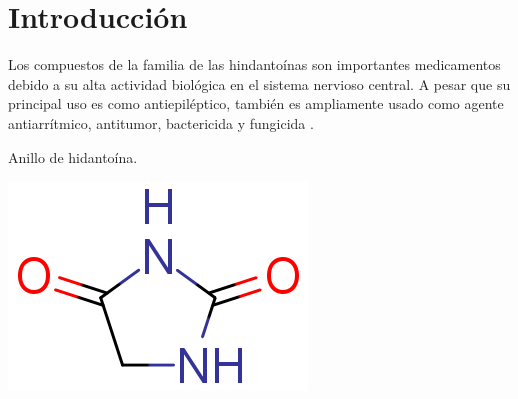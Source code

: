 \documentclass[fleqn,10pt]{SelfArx}
\begin{document}
\flushbottom %

\maketitle %


\thispagestyle{empty} %




\section*{Introducci\'on} %
Los compuestos de la familia de las hindanto\'inas son importantes medicamentos debido a su alta actividad biol\'ogica en el sistema nervioso central. A pesar que su principal uso es como antiepil\'eptico, tambi\'en es ampliamente usado como agente antiarr\'itmico, antitumor, bactericida y fungicida \cite{safari2010}\cite{ildiz2012}\cite{hayward1983}.
\begin{scheme}[h]
	\centering
	\caption{Anillo de hidanto\'ina.}
	\includegraphics[width=0.3\linewidth]{structures/hydantoin.png}
\end{scheme}
\end{document}
